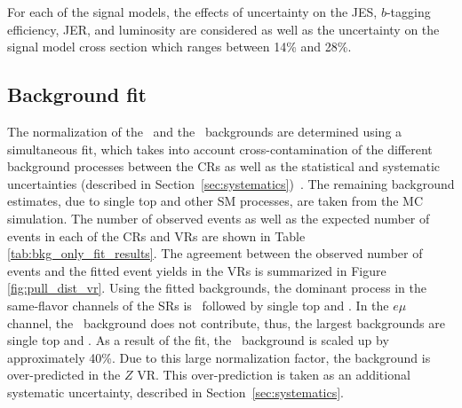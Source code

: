 For each of the signal models, the effects of uncertainty on the JES,
$b$-tagging efficiency, JER, and luminosity are considered as well as the
uncertainty on the signal model cross section which ranges between 14\%
and 28\%.

\subsection{Background fit}
\label{sec:bkg_fit}

The normalization of the \TTBAR\ and the \ZGAMMAJETS\ backgrounds are
determined using a simultaneous fit, which takes into account
cross-contamination of the different background processes between the
CRs as well as the statistical and systematic
uncertainties (described in Section~\ref{sec:systematics})~\cite{Baak:2014wma}.
The remaining background estimates, due to  single top and other SM processes,
are taken from the MC simulation.
The number of observed events as well as the expected number
of events in each of the CRs and VRs are shown in
Table \ref{tab:bkg_only_fit_results}.
The agreement between the observed number of events and the fitted event
yields in the VRs is summarized in Figure \ref{fig:pull_dist_vr}.
Using the fitted backgrounds, the dominant process in the same-flavor
channels of the SRs is \ZGAMMAJETS\ followed by single top and
\TTBAR. In the $e\mu$ channel, the \ZGAMMAJETS\ background does
not contribute, thus, the largest backgrounds are single top and \TTBAR.
As a result of the fit, the \ZGAMMAJETS\ background is scaled up by
approximately 40\%. Due to this large normalization factor, the background is
over-predicted in the $Z$ VR. This over-prediction is taken as an additional
systematic uncertainty, described in Section~\ref{sec:systematics}.

